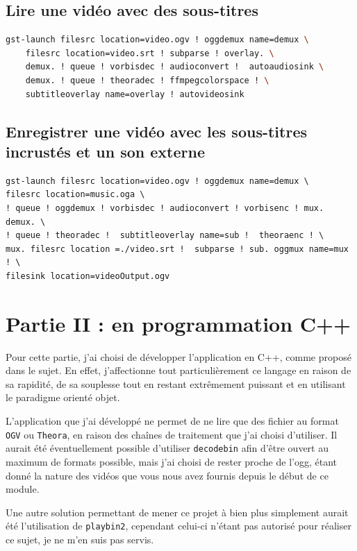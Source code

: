\documentclass[a4paper, 11pt]{article}
\begin{document}
	\subsection{Lire une vidéo avec des sous-titres}
	\begin{lstlisting}[language=Bash, caption=Lire une vidéo avec des sous-titres \texttt{.srt}]	
gst-launch filesrc location=video.ogv ! oggdemux name=demux \ 
	filesrc location=video.srt ! subparse ! overlay. \
	demux. ! queue ! vorbisdec ! audioconvert !  autoaudiosink \
	demux. ! queue ! theoradec ! ffmpegcolorspace ! \
	subtitleoverlay name=overlay ! autovideosink
\end{lstlisting}
	\subsection{Enregistrer une vidéo avec les sous-titres incrustés et un son externe}
	\begin{lstlisting}[language=Sh, caption=Enregistrer une vidéo avec l'audio \texttt{music.oga}\, l'image \texttt{video.ogv} et les sous-titres]
gst-launch filesrc location=video.ogv ! oggdemux name=demux \
filesrc location=music.oga \
! queue ! oggdemux ! vorbisdec ! audioconvert ! vorbisenc ! mux. demux. \
! queue ! theoradec !  subtitleoverlay name=sub !  theoraenc ! \
mux. filesrc location =./video.srt !  subparse ! sub. oggmux name=mux ! \
filesink location=videoOutput.ogv
	\end{lstlisting}
	\section{Partie II : en programmation C++}
	Pour cette partie, j'ai choisi de développer l'application en C++, comme proposé dans le sujet. En effet, j'affectionne tout particulièrement ce langage en
	raison de sa rapidité, de sa souplesse tout en restant extrêmement puissant et en utilisant le paradigme orienté objet.

	L'application que j'ai développé ne permet de ne lire que des fichier au format \texttt{OGV} ou \texttt{Theora}, en raison des chaînes de traitement que j'ai
	choisi d'utiliser. Il aurait été éventuellement possible
	d'utiliser \texttt{decodebin} afin d'être ouvert au
	maximum de formats possible, mais j'ai choisi de rester
	proche de l'ogg, étant donné la nature des vidéos que vous
	nous avez fournis depuis le début de ce module.

	Une autre solution permettant de mener ce projet à bien plus simplement aurait été l'utilisation de \texttt{playbin2}, cependant celui-ci n'étant pas
	autorisé pour réaliser ce sujet, je ne m'en suis pas
	servis. 
\end{document}
